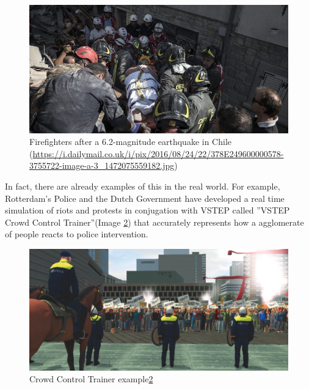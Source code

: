 \documentclass[sigconf]{acmart}
\begin{document}
\begin{figure}[h]
  \centering
  \includegraphics[width=\linewidth]{images/chile_firefighters.jpg}
  \caption{Firefighters after a 6.2-magnitude earthquake in Chile (\url{https://i.dailymail.co.uk/i/pix/2016/08/24/22/378E249600000578-3755722-image-a-3_1472075559182.jpg})}
  \label{fig:firefighters}
\end{figure}

In fact, there are already examples of this in the real world\cite{SIDIROPOULOS2020100009}. For example, Rotterdam's Police
and the Dutch Government have developed a real time simulation of riots and protests in conjugation with VSTEP
called ''VSTEP Crowd Control Trainer''\cite{crowdControl}(Image \ref{fig:police}) that accurately represents how
a agglomerate of people reacts to police intervention.

\begin{figure}[h]
  \centering
  \includegraphics[width=\linewidth]{images/crowd_control.png}
  \caption{Crowd Control Trainer example\ref{fig:police}}
  \label{fig:police}
\end{figure}
\end{document}
